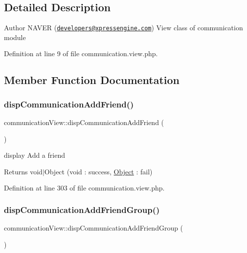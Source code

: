 \subsection{Detailed Description}
\begin{DoxyAuthor}{Author}
N\+A\+V\+ER (\href{mailto:developers@xpressengine.com}{\tt developers@xpressengine.\+com}) View class of communication module 
\end{DoxyAuthor}


Definition at line 9 of file communication.\+view.\+php.



\subsection{Member Function Documentation}
\hypertarget{classcommunicationView_a481636c7776213713b950a827aa6f728}{}\label{classcommunicationView_a481636c7776213713b950a827aa6f728} 
\subsubsection{\texorpdfstring{disp\+Communication\+Add\+Friend()}{dispCommunicationAddFriend()}}
{\footnotesize\ttfamily communication\+View\+::disp\+Communication\+Add\+Friend (\begin{DoxyParamCaption}{ }\end{DoxyParamCaption})}

display Add a friend \begin{DoxyReturn}{Returns}
void$\vert$\+Object (void \+: success, \hyperlink{classObject}{Object} \+: fail) 
\end{DoxyReturn}


Definition at line 303 of file communication.\+view.\+php.

\hypertarget{classcommunicationView_a6675ce671029732a7d5d6428287ddd4b}{}\label{classcommunicationView_a6675ce671029732a7d5d6428287ddd4b} 
\subsubsection{\texorpdfstring{disp\+Communication\+Add\+Friend\+Group()}{dispCommunicationAddFriendGroup()}}
{\footnotesize\ttfamily communication\+View\+::disp\+Communication\+Add\+Friend\+Group (\begin{DoxyParamCaption}{ }\end{DoxyParamCaption})}

